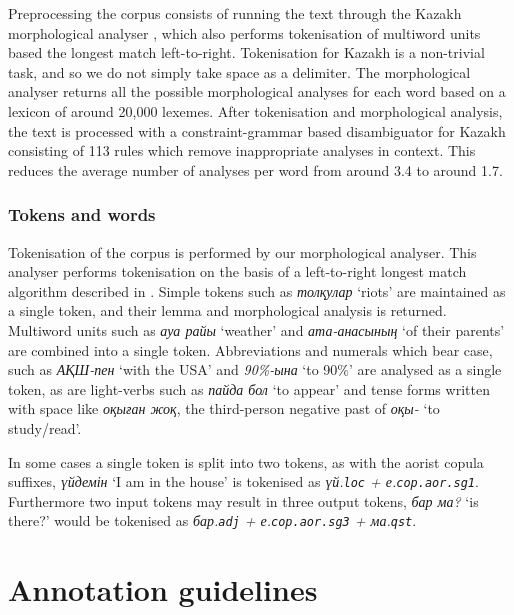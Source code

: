\documentclass[a4paper,11pt, onecolumn,twoside]{article}
\newcommand{\gmk}[1]{{\rm {\sc \texttt{#1}}}}
\newcommand{\kazakh}[1]{{\em #1}}
\newcommand{\gloss}[1]{`#1'}
\begin{document}
Preprocessing the corpus consists of running the text through the Kazakh morphological
analyser \parencite{Washington14}, which also performs tokenisation of multiword units based 
the longest match left-to-right. Tokenisation for Kazakh is a non-trivial task, and so
we do not simply take space as a delimiter. The morphological analyser returns all 
the possible morphological analyses for each word based on a lexicon of around 20,000 lexemes.
After tokenisation and morphological analysis, the text is processed with a constraint-grammar 
based disambiguator for Kazakh consisting of 113 rules which remove inappropriate 
analyses in context. This reduces the average number of analyses per word from around 3.4
to around 1.7.


\subsubsection{Tokens and words}

Tokenisation of the corpus is performed by our morphological analyser. This analyser
performs tokenisation on the basis of a left-to-right longest match algorithm described
in \textcite{garrido02}. Simple tokens such as \kazakh{толқулар} \gloss{riots} are maintained
as a single token, and their lemma and morphological analysis is returned. Multiword
units such as \kazakh{ауа райы} \gloss{weather} and \kazakh{ата-анасының} \gloss{of their parents} are combined
into a single token. Abbreviations and numerals which bear case, such as \kazakh{АҚШ-пен} \gloss{with the USA}
and \kazakh{90\%-ына} \gloss{to 90\%} are analysed as a single token, as are light-verbs such as
\kazakh{пайда бол} \gloss{to appear} and tense forms written with space like \kazakh{оқыған жоқ},
the third-person negative past of \kazakh{оқы-} \gloss{to study/read}.

In some cases a single token is split into two tokens, as with the aorist copula suffixes,
\kazakh{үйдемін} \gloss{I am in the house} is tokenised as \kazakh{үй.\gmk{loc} + е.\gmk{cop.aor.sg1}}. Furthermore
two input tokens may result in three output tokens, \kazakh{бар ма?} \gloss{is there?} would be
tokenised as \kazakh{бар.\gmk{adj} + е.\gmk{cop.aor.sg3} + ма.\gmk{qst}}.



\section{Annotation guidelines}\label{sec:annotation}
\end{document}
